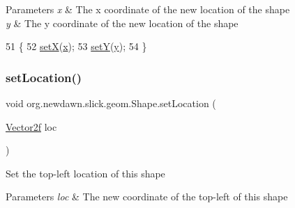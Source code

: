 \begin{DoxyParams}{Parameters}
{\em x} & The x coordinate of the new location of the shape \\
\hline
{\em y} & The y coordinate of the new location of the shape \\
\hline
\end{DoxyParams}

\begin{DoxyCode}
51                                               \{
52         \mbox{\hyperlink{classorg_1_1newdawn_1_1slick_1_1geom_1_1_shape_a1469b8ef682642c4257869640c27bf16}{setX}}(\mbox{\hyperlink{classorg_1_1newdawn_1_1slick_1_1geom_1_1_shape_a3e985bfff386c15a4efaad03d8ad60d3}{x}});
53         \mbox{\hyperlink{classorg_1_1newdawn_1_1slick_1_1geom_1_1_shape_a7a127d0dea9bd7f0e3ce3fd0a61268fc}{setY}}(\mbox{\hyperlink{classorg_1_1newdawn_1_1slick_1_1geom_1_1_shape_a9f934baded6a1b65ebb69e7e5f80ea00}{y}});
54     \}
\end{DoxyCode}
\mbox{\label{classorg_1_1newdawn_1_1slick_1_1geom_1_1_shape_abdb96498ceae960e9915154efed60f27}} 
\subsubsection{\texorpdfstring{set\+Location()}{setLocation()}\hspace{0.1cm}{\footnotesize\ttfamily [2/2]}}
{\footnotesize\ttfamily void org.\+newdawn.\+slick.\+geom.\+Shape.\+set\+Location (\begin{DoxyParamCaption}\item[{\mbox{\hyperlink{classorg_1_1newdawn_1_1slick_1_1geom_1_1_vector2f}{Vector2f}}}]{loc }\end{DoxyParamCaption})\hspace{0.3cm}{\ttfamily [inline]}}

Set the top-\/left location of this shape


\begin{DoxyParams}{Parameters}
{\em loc} & The new coordinate of the top-\/left of this shape \\
\hline
\end{DoxyParams}


